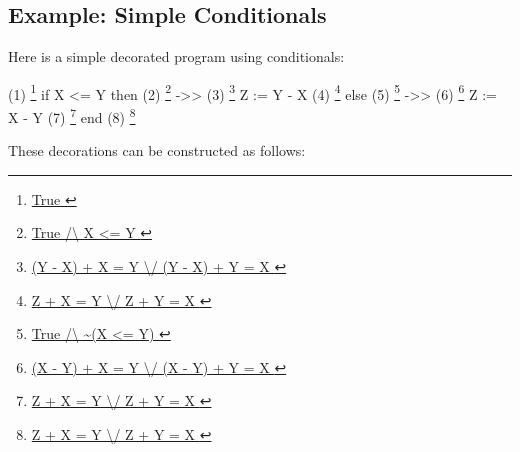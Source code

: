 \documentclass[12pt]{report}
\begin{document}
\begin{coqdoccode}
\coqdocemptyline
\end{coqdoccode}
\subsection{Example: Simple Conditionals}



 Here is a simple decorated program using conditionals:


      (1)   \footnote{\url{ True }}
              if X <= Y then
      (2)                    \footnote{\url{ True /\ X <= Y }} ->>
      (3)                    \footnote{\url{ (Y - X) + X = Y \/ (Y - X) + Y = X }}
                Z := Y - X
      (4)                    \footnote{\url{ Z + X = Y \/ Z + Y = X }}
              else
      (5)                    \footnote{\url{ True /\ ~(X <= Y) }} ->>
      (6)                    \footnote{\url{ (X - Y) + X = Y \/ (X - Y) + Y = X }}
                Z := X - Y
      (7)                    \footnote{\url{ Z + X = Y \/ Z + Y = X }}
              end
      (8)   \footnote{\url{ Z + X = Y \/ Z + Y = X }}


These decorations can be constructed as follows:
\end{document}
